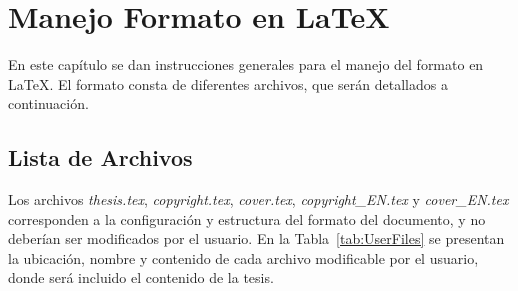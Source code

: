 \chapter{Manejo Formato en \LaTeX } \label{LatexFiles}

En este capítulo se dan instrucciones generales para el manejo del formato en \LaTeX. El formato consta de diferentes archivos, que serán detallados a continuación. 

\section{Lista de Archivos}

Los archivos \textit{thesis.tex}, \textit{copyright.tex}, \textit{cover.tex}, \textit{copyright\_EN.tex} y \textit{cover\_EN.tex} corresponden a la configuración y estructura del formato del documento, y no deberían ser modificados por el usuario. En la Tabla~\ref{tab:UserFiles} se presentan la ubicación, nombre y contenido de cada archivo modificable por el usuario, donde será incluido el contenido de la tesis.

